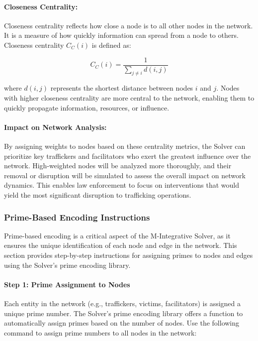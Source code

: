 \documentclass[%
 preprint, linenumbers,
 amsmath,amssymb,
 aps, physrev,
]{revtex4-2}
\begin{document}
\paragraph{Closeness Centrality:}
Closeness centrality reflects how close a node is to all other nodes in the network. It is a measure of how quickly information can spread from a node to others. Closeness centrality \(C_C(i)\) is defined as:

\[
C_C(i) = \frac{1}{\sum_{j \neq i} d(i,j)}
\]

where \(d(i,j)\) represents the shortest distance between nodes \(i\) and \(j\). Nodes with higher closeness centrality are more central to the network, enabling them to quickly propagate information, resources, or influence.

\paragraph{Impact on Network Analysis:}
By assigning weights to nodes based on these centrality metrics, the Solver can prioritize key traffickers and facilitators who exert the greatest influence over the network. High-weighted nodes will be analyzed more thoroughly, and their removal or disruption will be simulated to assess the overall impact on network dynamics. This enables law enforcement to focus on interventions that would yield the most significant disruption to trafficking operations.

\subsubsection{Prime-Based Encoding Instructions}

Prime-based encoding is a critical aspect of the M-Integrative Solver, as it ensures the unique identification of each node and edge in the network. This section provides step-by-step instructions for assigning primes to nodes and edges using the Solver’s prime encoding library.

\paragraph{Step 1: Prime Assignment to Nodes}
Each entity in the network (e.g., traffickers, victims, facilitators) is assigned a unique prime number. The Solver's prime encoding library offers a function to automatically assign primes based on the number of nodes. Use the following command to assign prime numbers to all nodes in the network:
\end{document}
